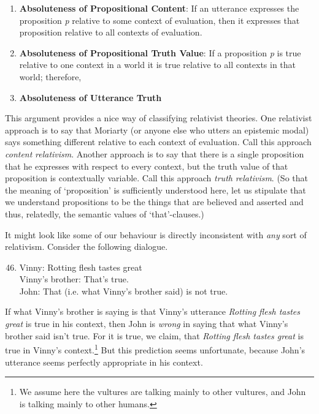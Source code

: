 \begin{enumerate}
\renewcommand{\labelenumi}{\arabic{enumi}.} 
\item \textbf{Absoluteness of Propositional Content}: If an utterance expresses the proposition \textit{p} relative to some context of evaluation, then it expresses that proposition relative to all contexts of evaluation.
\item \textbf{Absoluteness of Propositional Truth Value}: If a proposition \textit{p} is true relative to one context in a world it is true relative to all contexts in that world; therefore,
\item \textbf{Absoluteness of Utterance Truth}
\end{enumerate}

\noindent This argument provides a nice way of classifying relativist theories. One relativist approach is to say that Moriarty (or anyone else who utters an epistemic modal) says something different relative to each context of evaluation. Call this approach \textit{content} \textit{relativism}. Another approach is to say that there is a single proposition that he expresses with respect to every context, but the truth value of that proposition is contextually variable. Call this approach \textit{truth} \textit{relativism}. (So that the meaning of `proposition' is sufficiently understood here, let us stipulate that we understand propositions to be the things that are believed and asserted and thus, relatedly, the semantic values of `that'-clauses.) 
 
It might look like some of our behaviour is directly inconsistent with \textit{any} sort of relativism. Consider the following dialogue.
 
\begin{enumerate}
\setcounter{enumi}{45} 
\item Vinny: Rotting flesh tastes great \\
Vinny's brother: That's true. \\
John: That (i.e. what Vinny's brother said) is not true.
\end{enumerate}

\noindent If what Vinny's brother is saying is that Vinny's utterance \textit{Rotting flesh tastes great} is true in his context, then John is \textit{wrong} in saying that what Vinny's brother said isn't true. For it is true, we claim, that \textit{Rotting flesh tastes great} is true in Vinny's context.\footnote{We assume here the vultures are talking mainly to other vultures, and John is talking mainly to other humans.} But this prediction seems unfortunate, because John's utterance seems perfectly appropriate in his context.
 
